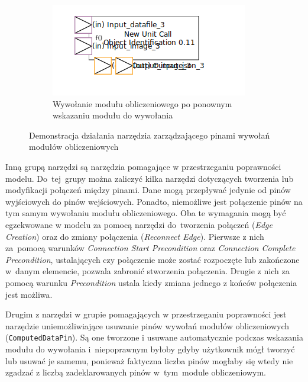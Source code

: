 \begin{figure}
\begin{subfigure}{.3\textwidth}
		\centering
		\includegraphics[width=.99\linewidth]{./images/sirius-desktop-change-unit-to-call-after.png}
		\caption{Wywołanie modułu obliczeniowego po ponownym wskazaniu modułu do
        wywołania}\label{rys:sirius-desktop-change-unit-to-call-after}
	\end{subfigure}

	\caption{Demonstracja działania narzędzia zarządzającego pinami wywołań
    modułów obliczeniowych}\label{rys:sirius-desktop-change-unit-to-call}
\end{figure}

Inną grupą narzędzi są narzędzia pomagające w przestrzeganiu poprawności
modelu. Do~tej~grupy można zaliczyć kilka narzędzi dotyczących tworzenia lub
modyfikacji połączeń między pinami. Dane mogą przepływać jedynie od pinów
wyjściowych do pinów wejściowych. Ponadto, niemożliwe jest połączenie pinów
na tym samym wywołaniu modułu obliczeniowego. Oba te wymagania mogą być
egzekwowane w modelu za pomocą narzędzi do~tworzenia połączeń (\emph{Edge
	Creation}) oraz do zmiany połączenia (\emph{Reconnect Edge}). Pierwsze
z nich za~pomocą warunków \emph{Connection Start Precondition} oraz
\emph{Connection Complete Precondition}, ustalających czy połączenie może
zostać
rozpoczęte lub zakończone w~danym elemencie, pozwala zabronić stworzenia
połączenia. Drugie z nich za pomocą warunku \emph{Precondition} ustala kiedy
zmiana jednego z końców połączenia jest możliwa.

Drugim z narzędzi w grupie pomagających w przestrzeganiu poprawności jest
narzędzie uniemożliwiające usuwanie pinów wywołań modułów obliczeniowych
(\texttt{ComputedDataPin}). Są one tworzone i usuwane automatycznie podczas
wskazania modułu do wywołania i~niepoprawnym byłoby gdyby użytkownik mógł
tworzyć lub usuwać je samemu, ponieważ faktyczna liczba pinów mogłaby się
wtedy nie
zgadzać z liczbą zadeklarowanych pinów w~tym~module obliczeniowym.

